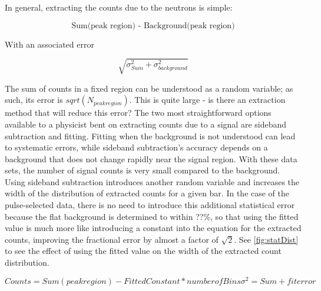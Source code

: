 In general, extracting the counts due to the neutrons is simple:

\begin{equation}
\text{Sum(peak region) - Background(peak region)}
\label{eq:counts}
\end{equation}

With an associated error

\begin{equation}
\sqrt{\sigma_{Sum}^2 + \sigma_{background}^2}
\label{eq:errDef}
\end{equation}

The sum of counts in a fixed region can be understood as a random variable; as such, its error is $sqrt(N_{peakregion})$.  This is quite large - is there an extraction method that will reduce this error?  The two most straightforward options available to a physicist bent on extracting counts due to a signal are sideband subtraction and fitting.  Fitting when the background is not understood can lead to systematic errors, while sideband subtraction's accuracy depends on a background that does not change rapidly near the signal region.  With these data sets, the number of signal counts is very small compared to the background.  Using sideband subtraction introduces another random variable and increases the width of the distribution of extracted counts for a given bar.  In the case of the pulse-selected data, there is no need to introduce this additional statistical error because the flat background is determined to within ??\%, so that using the fitted value is much more like introducing a constant into the equation for the extracted counts, improving the fractional error by almost a factor of $\sqrt{2}$.  See \fig \ref{fig:statDist} to see the effect of using the fitted value on the width of the extracted count distribution.

\begin{equation}
Counts = Sum(peak region) - Fitted Constant * number of Bins
\sigma^2 = Sum + fit error
\label{eq:fitErr}
\end{equation}

